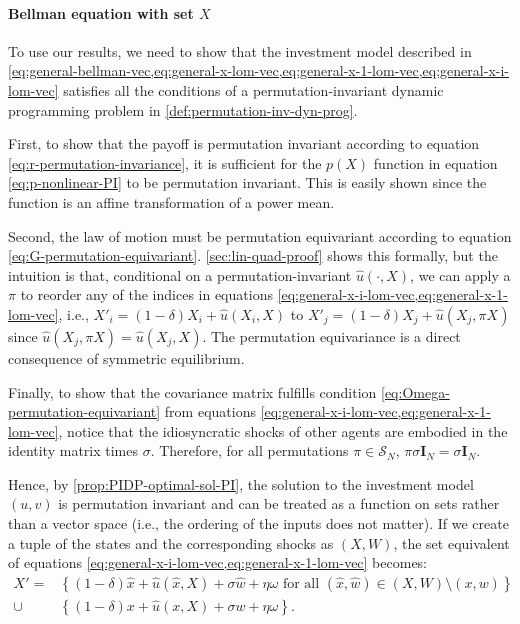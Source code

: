 \documentclass[12pt]{article}
\begin{document}
\paragraph{Bellman equation with set $X$} 
To use our results, we need to show that the investment model described in \cref{eq:general-bellman-vec,eq:general-x-lom-vec,eq:general-x-1-lom-vec,eq:general-x-i-lom-vec} satisfies all the conditions of a permutation-invariant dynamic programming problem in \cref{def:permutation-inv-dyn-prog}. 

First, to show that the payoff is permutation invariant according to equation \eqref{eq:r-permutation-invariance}, it is sufficient for the $p(X)$ function in equation \eqref{eq:p-nonlinear-PI} to be permutation invariant. This is easily shown since the function is an affine transformation of a  power mean.

Second, the law of motion must be permutation equivariant according to equation \eqref{eq:G-permutation-equivariant}. \cref{sec:lin-quad-proof} shows this formally, but the intuition is that, conditional on a permutation-invariant $\hat{u}(\cdot, X)$, we can apply a $\pi$ to reorder any of the indices in equations \cref{eq:general-x-i-lom-vec,eq:general-x-1-lom-vec}, i.e., $X'_i = (1-\delta) X_i + \hat{u}(X_i, X)$ to $X'_j = (1-\delta) X_j + \hat{u}(X_j, \pi X)$ since $\hat{u}(X_j, \pi X) = \hat{u}(X_j, X)$. The permutation equivariance is a direct consequence of symmetric equilibrium.

Finally, to show that the covariance matrix fulfills condition \cref{eq:Omega-permutation-equivariant} from equations \cref{eq:general-x-i-lom-vec,eq:general-x-1-lom-vec}, notice that the idiosyncratic shocks of other agents are embodied in the identity matrix times $\sigma$. Therefore, for all permutations $\pi \in \mathcal{S}_N$, $\pi \sigma \mathbf{I}_N = \sigma \mathbf{I}_N$.
	 
Hence, by \cref{prop:PIDP-optimal-sol-PI}, the solution to the investment model $(u,v)$ is permutation invariant and can be treated as a function on sets rather than a vector space (i.e., the ordering of the inputs does not matter). If we create a tuple of the states and the corresponding shocks as $(X,W)$, the set equivalent of equations \cref{eq:general-x-i-lom-vec,eq:general-x-1-lom-vec} becomes:
\begin{align}
X' = &\left\{(1-\delta)\hat{x} + \hat{u}(\hat{x},X) + \sigma \hat{w} + \eta \omega \text{ for all } (\hat{x},\hat{w}) \in (X,W) \setminus (x,w)\right\}\nonumber\\
\cup &\left\{(1-\delta)x + \hat{u}(x, X) + \sigma w + \eta \omega\right\}\label{eq:general-X-law-full}.
\end{align}
 	 
\end{document}
